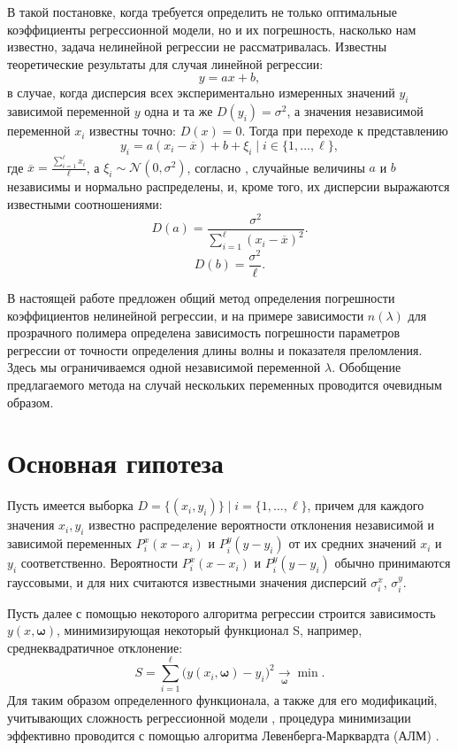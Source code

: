 \documentclass[11pt,a4paper]{article}
\theoremstyle{definition}
\begin{document}
В такой постановке, когда требуется определить не только
оптимальные коэффициенты регрессионной модели, но и их погрешность, насколько нам
известно, задача нелинейной регрессии не рассматривалась. Известны
теоретические результаты для случая линейной регрессии:
\[
  y = ax + b,
\]
в случае, когда дисперсия всех экспериментально измеренных значений $y_i$
зависимой переменной $y$ одна и та же $D(y_i) = \sigma^2$, а значения независимой
переменной $x_i$ известны точно: $D(x) = 0$. Тогда при переходе к представлению
\[
  y_i = a(x_i - \overline{x}) + b + \xi_i \mid i \in \{ 1, \dots, \ell \},
\]
где $\overline{x} = \frac{\sum_{i = 1}^\ell x_i}{\ell}$, а $\xi_i \sim \mathcal{N}(0, \sigma^2)$,
согласно \cite{Vatunin05}, случайные величины $a$ и $b$ независимы
и нормально распределены, и, кроме того, их дисперсии выражаются известными соотношениями:
\begin{equation}
  \label{eq:classic_da}
  D(a) = \frac{\sigma^2}{\sum_{i = 1}^\ell (x_i - \overline{x})^2}.
\end{equation}
\begin{equation}
  \label{eq:classic_db}
  D(b) = \frac{\sigma^2}{\ell}.
\end{equation}

В настоящей работе предложен общий метод определения
погрешности коэффициентов нелинейной регрессии, и на примере зависимости
$n(\lambda)$ для прозрачного полимера определена зависимость погрешности
параметров регрессии от точности определения длины волны и показателя
преломления. Здесь мы ограничиваемся одной
независимой переменной $\lambda$. Обобщение предлагаемого метода на случай
нескольких переменных проводится очевидным образом.

\section{Основная гипотеза}

Пусть имеется выборка $D = \{ (x_i, y_i) \} \mid i = \{ 1, \dots, \ell \}$,
причем для каждого значения $x_i, y_i$ известно распределение вероятности отклонения
независимой и зависимой переменных $P_i^x(x - x_i)$ и
$P_i^y(y - y_i)$ от их средних значений $x_i$ и
$y_i$ соответственно. Вероятности $P_i^x(x - x_i)$ и
$P_i^y(y - y_i)$ обычно принимаются гауссовыми, и для них
считаются известными значения дисперсий $\sigma_i^x$, $\sigma_i^y$.

Пусть далее с помощью некоторого алгоритма регрессии строится
зависимость $y(x, \boldsymbol{\omega})$, минимизирующая некоторый функционал S,
например, среднеквадратичное отклонение:
\begin{equation}
  S = \sum_{i=1}^\ell \big(y (x_i, \boldsymbol{\omega}) - y_i\big)^2 \underset{\boldsymbol{\omega}}{\rightarrow} \min.
  \label{eq:S}
\end{equation}
Для таким образом определенного функционала, а также для его модификаций,
учитывающих сложность регрессионной модели \cite{Rudoy13}, процедура минимизации эффективно
проводится с помощью алгоритма Левенберга-Марквардта (АЛМ) \cite{Marquardt1963Algorithm,more:78}.
\end{document}
